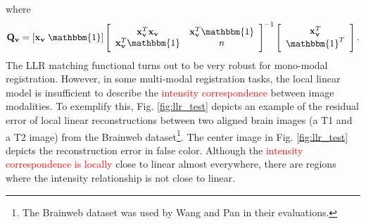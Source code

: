 \vspace{-0.2cm}
where
\vspace{-0.2cm}
\begin{equation}\label{eq:def_P_v}
    \mathbf{Q_v} = [\mathbf{x}_{\mathbf{v}} \; \mathbbm{1}]
    \left[\begin{array}{cc}
        \mathbf{x}_{\mathbf{v}}^{T}\mathbf{x}_{\mathbf{v}} & \mathbf{x}_{\mathbf{v}}^{T}\mathbbm{1}\\
        \mathbf{x}_{\mathbf{v}}^{T}\mathbbm{1} & n
    \end{array}\right]^{-1}
    \left[\begin{array}{c}
        \mathbf{x}_{\mathbf{v}}^{T}\\
        \mathbbm{1}^{T}
    \end{array}\right].
\end{equation}
The LLR matching functional turns out to be very robust for mono-modal registration. However, in some multi-modal registration tasks, the local linear model is insufficient to describe the \textcolor{red}{intensity correspondence} between image modalities. To exemplify this, Fig. \ref{fig:llr_test} depicts an example of the residual error of local linear reconstructions between two aligned brain images (a T1 and a T2 image) from the Brainweb \cite{Cocosco1997} dataset\footnote{The Brainweb dataset was used by Wang and Pan \cite{Wang2014} in their evaluations.}. The center image in Fig. \ref{fig:llr_test} depicts the reconstruction error in false color. Although the \textcolor{red}{ intensity correspondence is locally} close to linear almost everywhere, there are regions where the intensity relationship is not close to linear.\\


